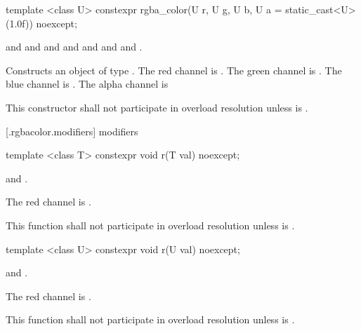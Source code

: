 %
\begin{itemdecl}
template <class U>
constexpr rgba_color(U r, U g, U b, U a = static_cast<U>(1.0f)) noexcept;
\end{itemdecl}
\begin{itemdescr}
\pnum
\requires
{} and  and  and  and  and  and  and .

\pnum
\effects
Constructs an object of type . The red channel is . The green channel is . The blue channel is . The alpha channel is 

\pnum
\remarks
This constructor shall not participate in overload resolution unless  is .
\end{itemdescr}


 [\iotwod.rgbacolor.modifiers]{ modifiers}

%
\begin{itemdecl}
template <class T>
constexpr void r(T val) noexcept;
\end{itemdecl}
\begin{itemdescr}
\pnum
\requires
{} and .

\pnum
\effects
The red channel is .

\pnum
\remarks
This function shall not participate in overload resolution unless  is .
\end{itemdescr}

%
\begin{itemdecl}
template <class U>
constexpr void r(U val) noexcept;
\end{itemdecl}
\begin{itemdescr}
\pnum
\requires
{} and .

\pnum
\effects
The red channel is .

\pnum
\remarks
This function shall not participate in overload resolution unless  is .
\end{itemdescr}

